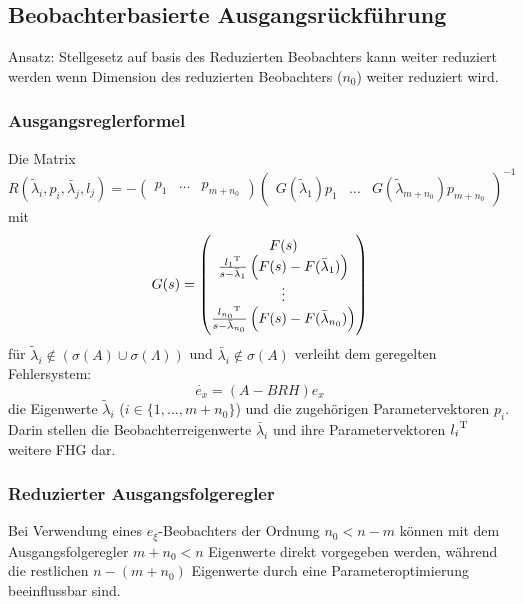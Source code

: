 \subsection{Beobachterbasierte Ausgangsrückführung}
Ansatz: Stellgesetz auf basis des Reduzierten Beobachters kann weiter
reduziert werden wenn Dimension des reduzierten Beobachters ($n_0$) weiter reduziert wird.

\subsubsection{Ausgangsreglerformel}
Die Matrix
\begin{equation}
    R(\tilde{\lambda}_i, p_i, \bar{\lambda}_j, l_j) = -
        \begin{pmatrix} p_1 & \ldots & p_{m+n_0} \end{pmatrix}
        {\begin{pmatrix} G(\tilde{\lambda}_1) p_1 & \ldots &
        G(\tilde{\lambda}_{m+n_0})p_{m+n_0} \end{pmatrix}}^{-1}
\end{equation}
mit
\begin{equation}
    G(s) = \begin{pmatrix}
            F(s) \\
            \frac{{l_1}^\text{T}}{s-\bar{\lambda}_1} \left(F(s) - F(\bar{\lambda}_1)\right) \\
            \vdots \\
            \frac{{l_{n_0}}^\text{T}}{s-\bar{\lambda}_{n_0}} \left(F(s) - F(\bar{\lambda}_{n_0})\right)
        \end{pmatrix}
\end{equation}
für $\tilde{\lambda}_i \notin \left(\sigma(A) \cup \sigma(\Lambda)\right)$ und
$\bar{\lambda}_i \notin \sigma(A)$ verleiht dem geregelten Fehlersystem:
\begin{equation}
    \dot{e_x} = (A-BRH) e_x
\end{equation}
die Eigenwerte $\tilde{\lambda}_i$ ($i \in \{1, \ldots, m+n_0\}$) und die zugehörigen 
Parametervektoren $p_i$. Darin stellen die Beobachterreigenwerte $\bar{\lambda}_i$ und
ihre Parametervektoren ${l_i}^\text{T}$ weitere FHG dar.

\subsubsection{Reduzierter Ausgangsfolgeregler}
Bei Verwendung eines $e_\xi$-Beobachters der Ordnung $n_0 < n-m$ können mit dem 
Ausgangsfolgeregler $m+n_0<n$ Eigenwerte direkt vorgegeben werden, während die restlichen
$n-(m+n_0)$ Eigenwerte durch eine Parameteroptimierung beeinflussbar sind.


